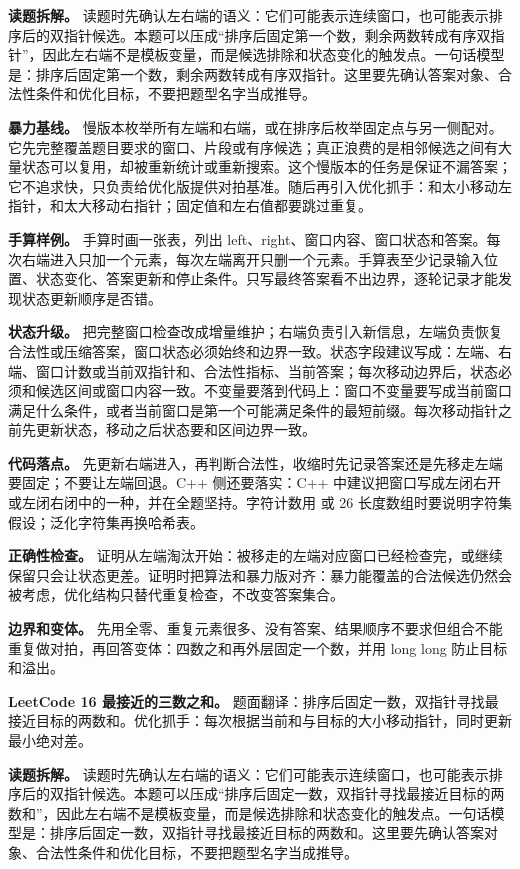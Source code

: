 \textbf{读题拆解。} 读题时先确认左右端的语义：它们可能表示连续窗口，也可能表示排序后的双指针候选。本题可以压成“排序后固定第一个数，剩余两数转成有序双指针”，因此左右端不是模板变量，而是候选排除和状态变化的触发点。一句话模型是：排序后固定第一个数，剩余两数转成有序双指针。这里要先确认答案对象、合法性条件和优化目标，不要把题型名字当成推导。

\textbf{暴力基线。} 慢版本枚举所有左端和右端，或在排序后枚举固定点与另一侧配对。它先完整覆盖题目要求的窗口、片段或有序候选；真正浪费的是相邻候选之间有大量状态可以复用，却被重新统计或重新搜索。这个慢版本的任务是保证不漏答案；它不追求快，只负责给优化版提供对拍基准。随后再引入优化抓手：和太小移动左指针，和太大移动右指针；固定值和左右值都要跳过重复。

\textbf{手算样例。} 手算时画一张表，列出 left、right、窗口内容、窗口状态和答案。每次右端进入只加一个元素，每次左端离开只删一个元素。手算表至少记录输入位置、状态变化、答案更新和停止条件。只写最终答案看不出边界，逐轮记录才能发现状态更新顺序是否错。

\textbf{状态升级。} 把完整窗口检查改成增量维护；右端负责引入新信息，左端负责恢复合法性或压缩答案，窗口状态必须始终和边界一致。状态字段建议写成：左端、右端、窗口计数或当前双指针和、合法性指标、当前答案；每次移动边界后，状态必须和候选区间或窗口内容一致。不变量要落到代码上：窗口不变量要写成当前窗口满足什么条件，或者当前窗口是第一个可能满足条件的最短前缀。每次移动指针之前先更新状态，移动之后状态要和区间边界一致。

\textbf{代码落点。} 先更新右端进入，再判断合法性，收缩时先记录答案还是先移走左端要固定；不要让左端回退。C++ 侧还要落实：C++ 中建议把窗口写成左闭右开或左闭右闭中的一种，并在全题坚持。字符计数用  或 26 长度数组时要说明字符集假设；泛化字符集再换哈希表。

\textbf{正确性检查。} 证明从左端淘汰开始：被移走的左端对应窗口已经检查完，或继续保留只会让状态更差。证明时把算法和暴力版对齐：暴力能覆盖的合法候选仍然会被考虑，优化结构只替代重复检查，不改变答案集合。

\textbf{边界和变体。} 先用全零、重复元素很多、没有答案、结果顺序不要求但组合不能重复做对拍，再回答变体：四数之和再外层固定一个数，并用 long long 防止目标和溢出。

\noindent\textbf{LeetCode 16 最接近的三数之和。} 题面翻译：排序后固定一数，双指针寻找最接近目标的两数和。优化抓手：每次根据当前和与目标的大小移动指针，同时更新最小绝对差。

\textbf{读题拆解。} 读题时先确认左右端的语义：它们可能表示连续窗口，也可能表示排序后的双指针候选。本题可以压成“排序后固定一数，双指针寻找最接近目标的两数和”，因此左右端不是模板变量，而是候选排除和状态变化的触发点。一句话模型是：排序后固定一数，双指针寻找最接近目标的两数和。这里要先确认答案对象、合法性条件和优化目标，不要把题型名字当成推导。

